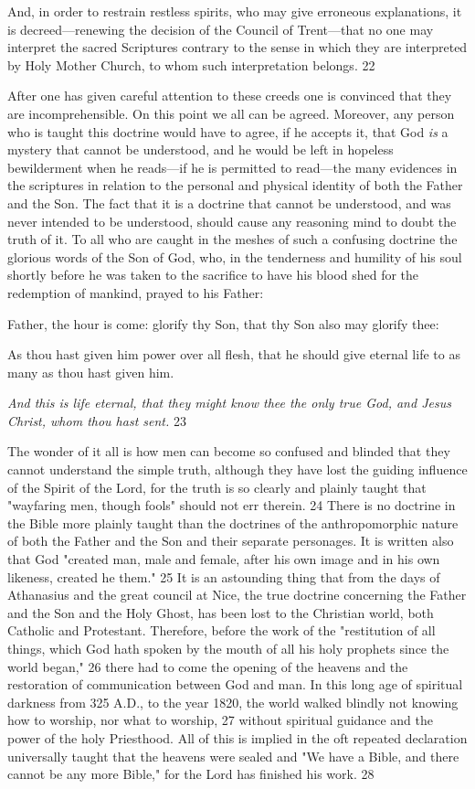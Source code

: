 And, in order to restrain restless spirits, who may give erroneous explanations, it is
decreed—renewing the decision of the Council of Trent—that no one may interpret the
sacred Scriptures contrary to the sense in which they are interpreted by Holy Mother Church,
to whom such interpretation belongs. 22

After one has given careful attention to these creeds one is convinced that they are
incomprehensible. On this point we all can be agreed. Moreover, any person who is taught
this doctrine would have to agree, if he accepts it, that God \textit{is} a mystery that cannot be
understood, and he would be left in hopeless bewilderment when he reads—if he is permitted
to read—the many evidences in the scriptures in relation to the personal and physical identity
of both the Father and the Son. The fact that it is a doctrine that cannot be understood, and
was never intended to be understood, should cause any reasoning mind to doubt the truth of
it. To all who are caught in the meshes of such a confusing doctrine the glorious words of the
Son of God, who, in the tenderness and humility of his soul shortly before he was taken to
the sacrifice to have his blood shed for the redemption of mankind, prayed to his Father:

Father, the hour is come: glorify thy Son, that thy Son also may glorify thee:

As thou hast given him power over all flesh, that he should give eternal life to as many as
thou hast given him.

\textit{And this is life eternal, that they might know thee the only true God, and Jesus Christ, whom
thou hast sent.} 23

The wonder of it all is how men can become so confused and blinded that they cannot
understand the simple truth, although they have lost the guiding influence of the Spirit of the
Lord, for the truth is so clearly and plainly taught that "wayfaring men, though fools" should
not err therein. 24 There is no doctrine in the Bible more plainly taught than the doctrines of
the anthropomorphic nature of both the Father and the Son and their separate personages. It is
written also that God "created man, male and female, after his own image and in his own
likeness, created he them." 25 It is an astounding thing that from the days of Athanasius and
the great council at Nice, the true doctrine concerning the Father and the Son and the Holy
Ghost, has been lost to the Christian world, both Catholic and Protestant. Therefore, before
the work of the "restitution of all things, which God hath spoken by the mouth of all his holy
prophets since the world began," 26 there had to come the opening of the heavens and the
restoration of communication between God and man. In this long age of spiritual darkness
from 325 A.D., to the year 1820, the world walked blindly not knowing how to worship, nor
what to worship, 27 without spiritual guidance and the power of the holy Priesthood. All of
this is implied in the oft repeated declaration universally taught that the heavens were sealed
and "We have a Bible, and there cannot be any more Bible," for the Lord has finished his
work. 28

